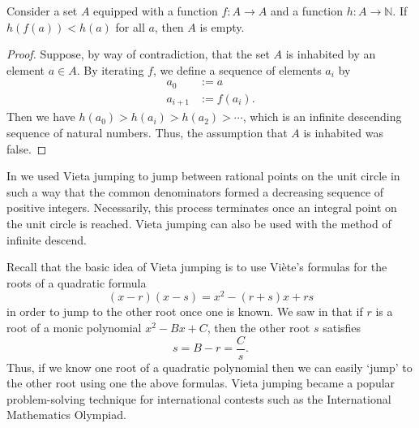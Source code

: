 \begin{theorem}\label{theorem:method-of-descent}
  Consider a set $A$ equipped with a function $f:A\to A$ and a function $h:A\to\mathbb{N}$. If $h(f(a))<h(a)$ for all $a$, then $A$ is empty.
\end{theorem}

\begin{proof}
  Suppose, by way of contradiction, that the set $A$ is inhabited by an element $a\in A$. By iterating $f$, we define a sequence of elements $a_i$ by
  \begin{align*}
    a_0 & := a \\
    a_{i+1} & := f(a_i).
  \end{align*}
  Then we have $h(a_0)>h(a_i)>h(a_2)>\cdots$, which is an infinite descending sequence of natural numbers. Thus, the assumption that $A$ is inhabited was false.
\end{proof}

In  we used Vieta jumping to jump between rational points on the unit circle in such a way that the common denominators formed a decreasing sequence of positive integers. Necessarily, this process terminates once an integral point on the unit circle is reached. Vieta jumping can also be used with the method of infinite descend.

Recall that the basic idea of Vieta jumping is to use Vi\`ete's formulas for the roots of a quadratic formula
\begin{equation*}
  (x-r)(x-s)=x^2-(r+s)x+rs
\end{equation*}
in order to jump to the other root once one is known.
We saw in  that if $r$ is a root of a monic polynomial $x^2-Bx+C$, then the other root $s$ satisfies
\begin{equation*}
  s=B-r=\frac{C}{s}.
\end{equation*}
Thus, if we know one root of a quadratic polynomial then we can easily `jump' to the other root using one the above formulas. Vieta jumping became a popular problem-solving technique for international contests such as the International Mathematics Olympiad.

